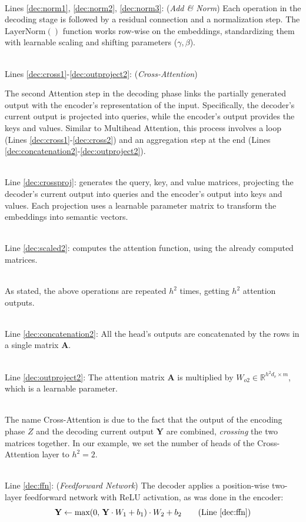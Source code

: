 \documentclass[algorithms,article,submit,pdftex,moreauthors]{Definitions/mdpi}
\begin{document}
~\\Lines \ref{dec:norm1}, \ref{dec:norm2}, \ref{dec:norm3}: (\textit{Add \& Norm})
Each operation in the decoding stage is followed by a residual connection and a normalization step. The $\text{LayerNorm}()$ function works row-wise on the embeddings, standardizing them with learnable scaling and shifting parameters ($\gamma, \beta$).

~\\Lines \ref{dec:cross1}-\ref{dec:outproject2}: (\textit{Cross-Attention})

\noindent The second Attention step in the decoding phase links the partially generated output with the encoder’s representation of the input. Specifically, the decoder’s current output is projected into queries, while the encoder’s output provides the keys and values. Similar to Multihead Attention, this process involves a loop (Lines \ref{dec:cross1}-\ref{dec:cross2}) and an aggregation step at the end (Lines \ref{dec:concatenation2}-\ref{dec:outproject2}).

~\\Line \ref{dec:crossproj}: generates the query, key, and value matrices, projecting the decoder’s current output into queries and the encoder’s output into keys and values. Each projection uses a learnable parameter matrix to transform the embeddings into semantic vectors.

~\\Line \ref{dec:scaled2}: computes the attention function, using the already computed matrices.

~\\As stated, the above operations are repeated $h^2$ times, getting $h^2$ attention outputs.

~\\Line \ref{dec:concatenation2}: All the head's outputs are concatenated by the rows in a single matrix $\textbf{A}$.

~\\Line \ref{dec:outproject2}: The attention matrix $\textbf{A}$ is multiplied by $W_{o2} \in \mathbb{R}^{h^2d_v \times m}$, which is a learnable parameter.

~\\The name Cross-Attention is due to the fact that the output of the encoding phase $Z$ and the decoding current output $\textbf{Y}$ are combined, \textit{crossing} the two matrices together. In our example, we set the number of heads of the Cross-Attention layer to $h^2 = 2$.

~\\Line \ref{dec:ffn}: (\textit{Feedforward Network})
\noindent The decoder applies a position-wise two-layer feedforward network with ReLU activation, as was done in the encoder:
\begin{equation}
    \textbf{Y} \leftarrow \text{max}(0,\,\textbf{Y}\cdot W_1 + b_1) \cdot W_2 + b_2
\tag{Line \ref{dec:ffn}}
\end{equation}
\end{document}
